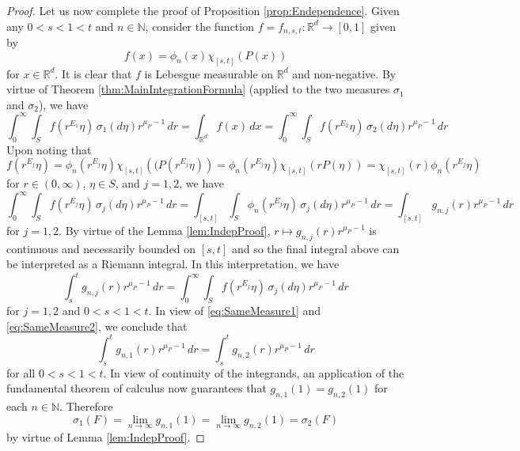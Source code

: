\documentclass[11pt, letter]{book}
\begin{document}
\begin{proof}
\noindent Let us now complete the proof of Proposition \ref{prop:Endependence}. Given any $0<s<1< t$ and $n\in\mathbb{N}$, consider the function $f=f_{n,s,t}:\mathbb{R}^d\to [0,1]$ given by
\begin{equation*}
f(x)=\phi_n(x)\chi_{[s,t]}(P(x))
\end{equation*}
for $x\in\mathbb{R}^d$. It is clear that $f$ is Lebesgue measurable on $\mathbb{R}^d$ and non-negative. By virtue of Theorem \ref{thm:MainIntegrationFormula} (applied to the two measures $\sigma_1$ and $\sigma_2$), we have
\begin{equation}\label{eq:SameMeasure1}
\int_0^\infty \int_Sf(r^{E_1}\eta)\,\sigma_1(d\eta)r^{\mu_P-1}\,dr=\int_{\mathbb{R}^d}f(x)\,dx=\int_0^\infty \int_Sf(r^{E_2}\eta)\,\sigma_2(d\eta)r^{\mu_P-1}\,dr
\end{equation}
Upon noting that
\begin{equation*}
f(r^{E_j}\eta)=\phi_n(r^{E_j}\eta)\chi_{[s,t]}\left((P(r^{E_j}\eta)\right)=\phi_n(r^{E_j}\eta)\chi_{[s,t]}(rP(\eta))=\chi_{[s,t]}(r)\phi_n(r^{E_j}\eta)
\end{equation*}
for $r\in (0,\infty)$, $\eta\in S$, and $j=1,2$, we have
\begin{equation*}
\int_0^\infty\int_S f(r^{E_j}\eta)\,\sigma_j(d\eta)r^{\mu_P-1}\,dr=\int_{[s,t]}\int_S\phi_n(r^{E_j}\eta)\,\sigma_j(d\eta) r^{\mu_P-1}\,dr=\int_{[s,t]}g_{n,j}(r)r^{\mu_P-1}\,dr
\end{equation*}
for $j=1,2$. By virtue of the Lemma \ref{lem:IndepProof}, $r\mapsto g_{n,j}(r)r^{\mu_P-1}$ is continuous and necessarily bounded on $[s,t]$ and so the final integral above can be interpreted as a Riemann integral. In this interpretation, we have
\begin{equation}\label{eq:SameMeasure2}
\int_s^tg_{n,j}(r)r^{\mu_P-1}\,dr=\int_0^\infty \int_S f(r^{E_j}\eta)\,\sigma_j(d\eta)r^{\mu_P-1}\,dr
\end{equation}
for $j=1,2$ and $0<s<1<t$. In view of \eqref{eq:SameMeasure1} and \eqref{eq:SameMeasure2}, we conclude that
\begin{equation*}
\int_s^t g_{n,1}(r)r^{\mu_P-1}\,dr=\int_s^t g_{n,2}(r)r^{\mu_P-1}\,dr
\end{equation*}
for all $0<s<1<t$. In view of continuity of the integrands, an application of the fundamental theorem of calculus now guarantees that $g_{n,1}(1)=g_{n,2}(1)$ for each $n\in\mathbb{N}$. Therefore
\begin{equation*}
\sigma_1(F)=\lim_{n\to\infty}g_{n,1}(1)=\lim_{n\to\infty}g_{n,2}(1)=\sigma_2(F)
\end{equation*}
by virtue of Lemma \ref{lem:IndepProof}.
\end{proof}
\end{document}
